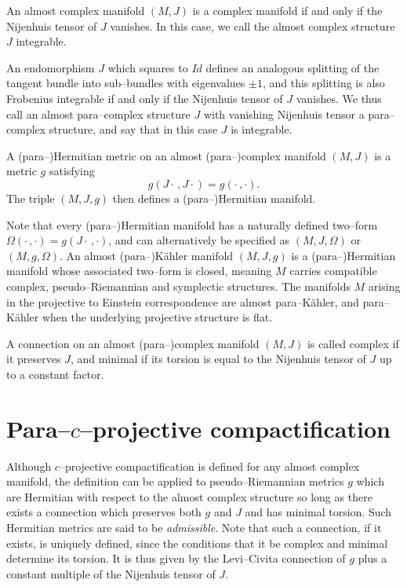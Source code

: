 \begin{theo}[\cite{CG}]
An almost complex manifold $(M,J)$ is a complex manifold if and only if the Nijenhuis tensor of $J$ vanishes. In this case, we call the almost complex structure $J$ integrable.
\end{theo}


An endomorphism $J$ which squares to $Id$ defines an analogous splitting of the tangent bundle into sub--bundles with eigenvalues $\pm 1$, and this splitting is also Frobenius integrable if and only if the Nijenhuis tensor of $J$ vanishes. We thus call an almost para--complex structure $J$ with vanishing Nijenhuis tensor a para--complex structure, and say that in this case $J$ is integrable.

\begin{defi}
A (para--)Hermitian metric on an almost (para--)complex manifold $(M,J)$ is a metric $g$ satisfying
\[
g(J\cdot\,,J\cdot) = g(\cdot\,,\cdot).
\]
The triple $(M,J,g)$ then defines a (para--)Hermitian manifold.
\end{defi}

Note that every (para--)Hermitian manifold has a naturally defined two--form $\Omega(\cdot\,,\cdot)=g(J\cdot\,,\cdot)$, and can alternatively be specified as $(M,J,\Omega)$ or $(M,g,\Omega)$. An almost (para--)K\"ahler manifold $(M,J,g)$ is a (para--)Hermitian manifold whose associated two--form is closed, meaning $M$ carries compatible complex, pseudo--Riemannian and symplectic structures. The manifolds $M$ arising in the projective to Einstein correspondence are almost para--K\"ahler, and para--K\"ahler when the underlying projective structure is flat.

\begin{defi}
A connection on an almost (para--)complex manifold $(M,J)$ is called complex if it preserves $J$, and minimal if its torsion is equal to the Nijenhuis tensor of $J$ up to a constant factor.
\end{defi}



\section{Para--$c$--projective compactification}
Although $c$--projective compactification is defined for any almost complex manifold, the definition can be applied to pseudo--Riemannian metrics $g$ which are Hermitian with respect to the almost complex structure so long as there exists a connection which preserves both $g$ and $J$ and has minimal torsion. Such Hermitian metrics are said to be \textit{admissible}.  Note that such a connection, if it exists, is uniquely defined, since the conditions that it be complex and minimal determine its torsion. It is thus given by the Levi--Civita connection of $g$ plus a constant multiple of the Nijenhuis tensor of $J$.

